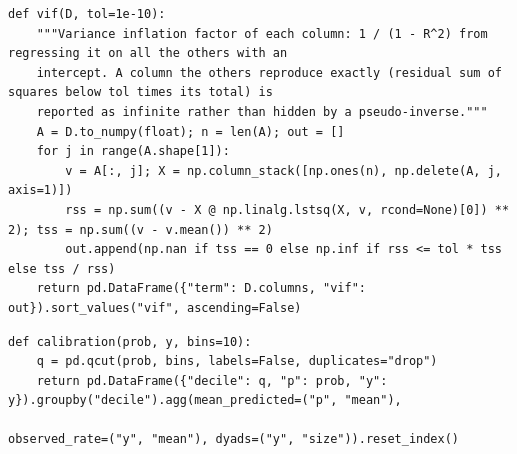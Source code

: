 \documentclass[11pt]{article}
\begin{document}
\begin{lstlisting}[caption={Variance inflation factors (scripts/part1\_models.py)}]
def vif(D, tol=1e-10):
    """Variance inflation factor of each column: 1 / (1 - R^2) from regressing it on all the others with an
    intercept. A column the others reproduce exactly (residual sum of squares below tol times its total) is
    reported as infinite rather than hidden by a pseudo-inverse."""
    A = D.to_numpy(float); n = len(A); out = []
    for j in range(A.shape[1]):
        v = A[:, j]; X = np.column_stack([np.ones(n), np.delete(A, j, axis=1)])
        rss = np.sum((v - X @ np.linalg.lstsq(X, v, rcond=None)[0]) ** 2); tss = np.sum((v - v.mean()) ** 2)
        out.append(np.nan if tss == 0 else np.inf if rss <= tol * tss else tss / rss)
    return pd.DataFrame({"term": D.columns, "vif": out}).sort_values("vif", ascending=False)
\end{lstlisting}

\begin{lstlisting}[caption={Calibration by decile (scripts/part1\_models.py)}]
def calibration(prob, y, bins=10):
    q = pd.qcut(prob, bins, labels=False, duplicates="drop")
    return pd.DataFrame({"decile": q, "p": prob, "y": y}).groupby("decile").agg(mean_predicted=("p", "mean"),
                                                                             observed_rate=("y", "mean"), dyads=("y", "size")).reset_index()
\end{lstlisting}
\end{document}
